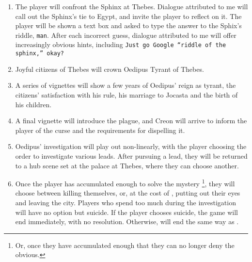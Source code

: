 \begin{enumerate}
\item The player will confront the Sphinx at Thebes. Dialogue attributed to me will call
  out the Sphinx's tie to Egypt, and invite the player to reflect on it. The player will
  be shown a text box and asked to type the answer to the Sphix's riddle,
  \texttt{man}. After each incorrect guess, dialogue attributed to me will offer
  increasingly obvious hints, including \texttt{Just go Google \enquote{riddle of the
      sphinx,} okay?}
\item Joyful citizens of Thebes will crown Oedipus Tyrant of Thebes.
\item A series of vignettes will show a few years of Oedipus' reign as tyrant, the
  citizens' satisfaction with his rule, his marriage to Jocasta and the birth of his
  children.
\item A final vignette will introduce the plague, and Creon will arrive to inform the
  player of the curse and the requirements for dispelling it.
\item Oedipus' investigation will play out non-linearly, with the player choosing the
  order to investigate various leads. After pursuing a lead, they will be returned to a
  hub scene set at the palace at Thebes, where they can choose another.
\item Once the player has accumulated enough \knowledge{} to solve the mystery
  \footnote{Or, once they have accumulated enough \knowledge{} that they can no longer
    deny the obvious.}, they will choose between killing themselves, or, at the cost of
  \selfcontrol{}, putting out their eyes and leaving the city. Players who spend too much
  \selfcontrol{} during the investigation will have no option but suicide. If the player
  chooses suicide, the game will end immediately, with no resolution. Otherwise,
  \thegame{} will end the same way as \theplay{}.
\end{enumerate}

